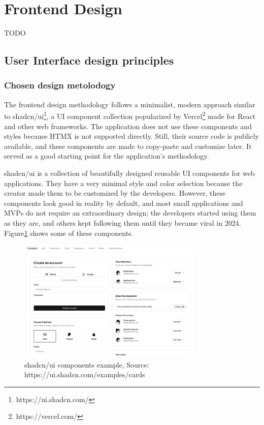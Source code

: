 \section{Frontend Design}
TODO

\subsection{User Interface design principles}

\subsubsection{Chosen design metolodogy}

The frontend design methodology follows a minimalist, modern approach similar to shadcn/ui\footnote{https://ui.shadcn.com/}, a UI component collection popularized by Vercel\footnote{https://vercel.com/} made for React and other web frameworks. The application does not use these components and styles because HTMX is not supported directly. Still, their source code is publicly available, and these components are made to copy-paste and customize later. It served as a good starting point for the application's methodology.

shadcn/ui is a collection of beautifully designed reusable UI components for web applications. They have a very minimal style and color selection because the creator made them to be customized by the developers. However, these components look good in reality by default, and most small applications and MVPs do not require an extraordinary design; the developers started using them as they are, and others kept following them until they became viral in 2024. Figure\ref{fig:shadcn} shows some of these components.

\begin{figure}[H]
    \centering
    \includegraphics[width=0.8\textwidth, keepaspectratio]{figures/shadcn-example.png}
    \caption{shadcn/ui components example, Source: https://ui.shadcn.com/examples/cards}
    \label{fig:shadcn}
\end{figure}

